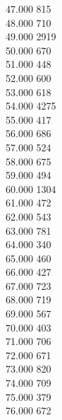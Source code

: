 { 47.000	815 \\
 48.000	710 \\
 49.000	2919 \\
 50.000	670 \\
 51.000	448 \\
 52.000	600 \\
 53.000	618 \\
 54.000	4275 \\
 55.000	417 \\
 56.000	686 \\
 57.000	524 \\
 58.000	675 \\
 59.000	494 \\
 60.000	1304 \\
 61.000	472 \\
 62.000	543 \\
 63.000	781 \\
 64.000	340 \\
 65.000	460 \\
 66.000	427 \\
 67.000	723 \\
 68.000	719 \\
 69.000	567 \\
 70.000	403 \\
 71.000	706 \\
 72.000	671 \\
 73.000	820 \\
 74.000	709 \\
 75.000	379 \\
 76.000	672 \\
}
